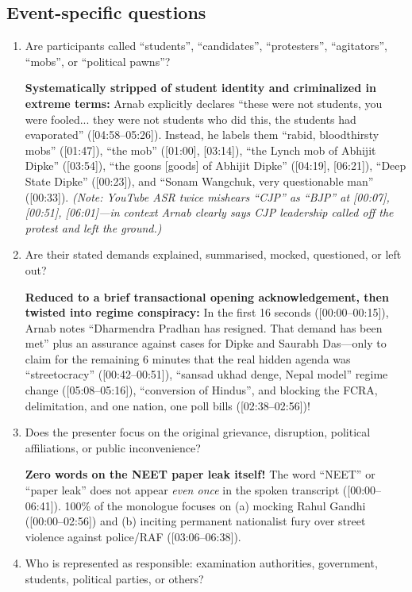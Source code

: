 \documentclass[10pt,a4paper]{article}
\begin{document}
\subsection*{Event-specific questions}
{\small
\begin{enumerate}[leftmargin=1.5em, itemsep=6pt, topsep=4pt]
  \item Are participants called ``students'', ``candidates'', ``protesters'', ``agitators'', ``mobs'', or ``political pawns''?\par\smallskip
  \textbf{Systematically stripped of student identity and criminalized in extreme terms:} Arnab explicitly declares ``these were not students, you were fooled... they were not students who did this, the students had evaporated'' ([04:58--05:26]). Instead, he labels them ``rabid, bloodthirsty mobs'' ([01:47]), ``the mob'' ([01:00], [03:14]), ``the Lynch mob of Abhijit Dipke'' ([03:54]), ``the goons [goods] of Abhijit Dipke'' ([04:19], [06:21]), ``Deep State Dipke'' ([00:23]), and ``Sonam Wangchuk, very questionable man'' ([00:33]). \emph{(Note: YouTube ASR twice mishears ``CJP'' as ``BJP'' at [00:07], [00:51], [06:01]---in context Arnab clearly says CJP leadership called off the protest and left the ground.)}
  \item Are their stated demands explained, summarised, mocked, questioned, or left out?\par\smallskip
  \textbf{Reduced to a brief transactional opening acknowledgement, then twisted into regime conspiracy:} In the first 16 seconds ([00:00--00:15]), Arnab notes ``Dharmendra Pradhan has resigned. That demand has been met'' plus an assurance against cases for Dipke and Saurabh Das---only to claim for the remaining 6 minutes that the real hidden agenda was ``streetocracy'' ([00:42--00:51]), ``sansad ukhad denge, Nepal model'' regime change ([05:08--05:16]), ``conversion of Hindus'', and blocking the FCRA, delimitation, and one nation, one poll bills ([02:38--02:56])!
  \item Does the presenter focus on the original grievance, disruption, political affiliations, or public inconvenience?\par\smallskip
  \textbf{Zero words on the NEET paper leak itself!} The word ``NEET'' or ``paper leak'' does not appear \emph{even once} in the spoken transcript ([00:00--06:41]). 100\% of the monologue focuses on (a) mocking Rahul Gandhi ([00:00--02:56]) and (b) inciting permanent nationalist fury over street violence against police/RAF ([03:06--06:38]).
  \item Who is represented as responsible: examination authorities, government, students, political parties, or others?\par\smallskip

\end{enumerate}}
\end{document}
